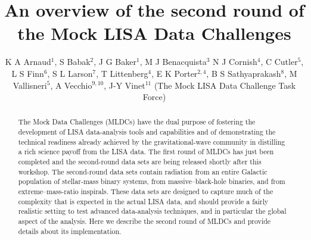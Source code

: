 \documentclass{iopart}
\begin{document}
\title[The second round of Mock LISA Data Challenges]{An overview of the second round of the Mock LISA Data Challenges}

\author{K A Arnaud$^1$,
S Babak$^2$,
J G Baker$^1$,
M J Benacquista$^3$
N J Cornish$^4$,
C Cutler$^5$,
L S Finn$^6$,
S L Larson$^7$,
T Littenberg$^4$,
E K Porter$^{2,4}$,
B S Sathyaprakash$^8$,
M Vallisneri$^5$,
A Vecchio$^{9,10}$,
J-Y Vinet$^{11}$ (The Mock LISA Data Challenge Task Force)}

\address{$^1$ Gravitational Astrophysics Laboratory, NASA Goddard Space Flight Center, 8800 Greenbelt Road, Greenbelt, MD 20771, US}
\address{$^2$ Max-Planck-Institut f\"{u}r Gravitationsphysik (Albert-Einstein-Institut), Am M\"{u}hlenberg 1, D-14476 Golm bei Potsdam, Germany}
\address{$^3$ Center for Gravitational Wave Astronomy, University of Texas at Brownsville, Brownsville, TX 78520, US}
\address{$^4$ Dept.\ of Phys., Montana State University, Bozeman, MT 59717, US}
\address{$^{5}$ Jet Propulsion Laboratory, California Institute of Technology, Pasadena, CA 91109, US}
\address{$^{6}$ Center for Gravitational Wave Physics, The Pennsylvania State University, University Park, PA 16802, US}
\address{$^{7}$ Dept.\ of Phys., Weber State University, 2508 University of Circle, Ogden, UT 84408, US}
\address{$^{8}$ Dept.\ of Phys.\ and Astron., Cardiff University, 5, The Parade, Cardiff, CF24 3YB, UK}
\address{$^{9}$ School of Phys.\ and Astron., University of Birmingham, Edgbaston, Birmingham B152TT, UK}
\address{$^{10}$ Dept.\ of Phys.\ and Astron., Northwestern University, Evanston, IL 60208, US}
\address{$^{11}$ D\'epartement ARTEMIS, Observatoire de la C\^{o}te d'Azur, BP 429, 06304 Nice, France}
\begin{abstract}
The Mock Data Challenges (MLDCs) have the dual purpose of fostering the development of LISA data-analysis tools and capabilities and of demonstrating the technical readiness already achieved by the gravitational-wave community in distilling a rich science payoff from the LISA data. The first round of MLDCs has just been completed and the second-round data sets are being released shortly after this workshop. The second-round data sets contain radiation from an entire Galactic population of stellar-mass binary systems, from massive--black-hole binaries, and from extreme--mass-ratio inspirals. These data sets are designed to capture much of the complexity that is expected in the actual LISA data, and should provide a fairly realistic setting to test advanced data-analysis techniques, and in particular the global aspect of the analysis. Here we describe the second round of MLDCs and provide details about its implementation.
\end{abstract}
\end{document}
